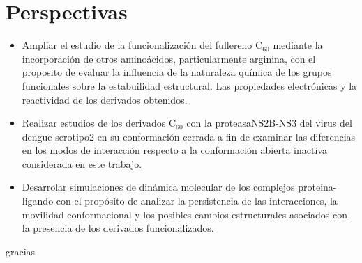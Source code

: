 \chapter{Perspectivas}
\begin{itemize}
\item Ampliar el estudio de la funcionalización del fullereno C$_{60}$ mediante la incorporación de otros aminoácidos, particularmente arginina, con el proposito de evaluar la influencia de la naturaleza química de los grupos funcionales sobre la estabuilidad estructural. Las propiedades electrónicas y la reactividad de los derivados obtenidos. 
\item Realizar estudios de los derivados  C$_{60}$ con la proteasaNS2B-NS3 del virus del dengue serotipo2 en su conformación cerrada a fin de examinar las diferencias en los modos de interacción respecto a la conformación abierta inactiva considerada en este trabajo. 
\item Desarrolar simulaciones de dinámica molecular de los complejos proteina-ligando con el propósito de analizar la persistencia de las interacciones, la movilidad conformacional y los posibles cambios estructurales asociados con la presencia de los derivados funcionalizados. 
\end{itemize}


gracias 
